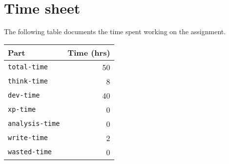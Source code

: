 \documentclass{acm_proc_article-sp}
\begin{document}
\appendix
\section{Time sheet}

The following table documents the time spent working on the assignment.

\begin{tabular}{ | l | r | }
	\hline
	Part & Time (hrs) \\ \hline \hline
	\texttt{total-time} & 50\\ \hline
	\texttt{think-time} & 8\\ \hline
	\texttt{dev-time} & 40\\ \hline
	\texttt{xp-time} & 0\\ \hline
	\texttt{analysis-time} & 0\\ \hline
	\texttt{write-time} & 2\\ \hline
	\texttt{wasted-time} & 0\\ \hline
\end{tabular}
\end{document}
